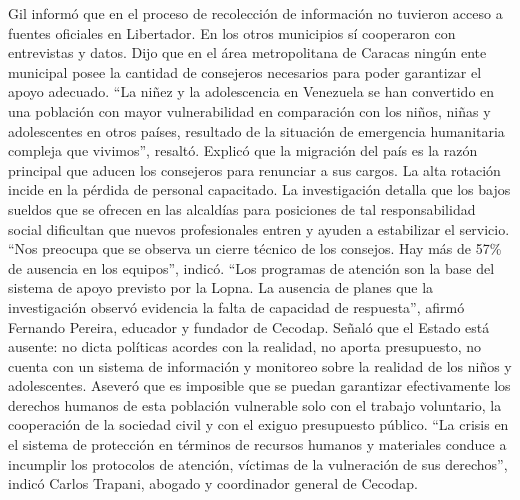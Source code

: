 \documentclass{article}%
\begin{document}
\newline%
%
Gil informó que en el proceso de recolección de información no tuvieron acceso a fuentes oficiales en Libertador. En los otros municipios sí cooperaron con entrevistas y datos.%
\newline%
%
Dijo que en el área metropolitana de Caracas ningún ente municipal posee la cantidad de consejeros necesarios para poder garantizar el apoyo adecuado. “La niñez y la adolescencia en Venezuela se han convertido en una población con mayor vulnerabilidad en comparación con los niños, niñas y adolescentes en otros países, resultado de la situación de emergencia humanitaria compleja que vivimos”, resaltó.%
\newline%
%
Explicó que la migración del país es la razón principal que aducen los consejeros para renunciar a sus cargos. La alta rotación incide en la pérdida de personal capacitado.%
\newline%
%
La investigación detalla que los bajos sueldos que se ofrecen en las alcaldías para posiciones de tal responsabilidad social dificultan que nuevos profesionales entren y ayuden a estabilizar el servicio.%
\newline%
%
“Nos preocupa que se observa un cierre técnico de los consejos. Hay más de 57\% de ausencia en los equipos”, indicó.%
\newline%
%
“Los programas de atención son la base del sistema de apoyo previsto por la Lopna. La ausencia de planes que la investigación observó evidencia la falta de capacidad de respuesta”, afirmó Fernando Pereira, educador y fundador de Cecodap.%
\newline%
%
Señaló que el Estado está ausente: no dicta políticas acordes con la realidad, no aporta presupuesto, no cuenta con un sistema de información y monitoreo sobre la realidad de los niños y adolescentes.%
\newline%
%
Aseveró que es imposible que se puedan garantizar efectivamente los derechos humanos de esta población vulnerable solo con el trabajo voluntario, la cooperación de la sociedad civil y con el exiguo presupuesto público.%
\newline%
%
“La crisis en el sistema de protección en términos de recursos humanos y materiales conduce a incumplir los protocolos de atención, víctimas de la vulneración de sus derechos”, indicó Carlos Trapani, abogado y coordinador general de Cecodap.%
\newline%
%
\end{document}
